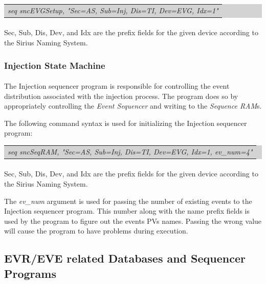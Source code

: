 \documentclass[openany]{article}
\begin{document}
			\bigskip
			\colorbox{lightgray}{
				\begin{tabularx}{0.9\textwidth}{X}
				\emph{seq sncEVGSetup, "Sec=AS, Sub=Inj, Dis=TI, Dev=EVG, Idx=1"}
				\end{tabularx}
			}

			\paragraph{} Sec, Sub, Dis, Dev, and Idx are the prefix fields for the given device according to the Sirius Naming System.
		\subsubsection{Injection State Machine}

			\paragraph{} The Injection sequencer program is responsible for controlling the event distribution associated with the injection process. The program does so by appropriately controlling the \emph{Event Sequencer} and writing to the \emph{Sequence RAM}s.
			\par The following command syntax is used for initializing the Injection sequencer program:

			\bigskip
			\colorbox{lightgray}{
				\begin{tabularx}{0.9\textwidth}{X}
				\emph{seq sncSeqRAM, "Sec=AS, Sub=Inj, Dis=TI, Dev=EVG, Idx=1, ev\_num=4"}
				\end{tabularx}
			}

			\paragraph{} Sec, Sub, Dis, Dev, and Idx are the prefix fields for the given device according to the Sirius Naming System.
			\par The \emph{ev\_num} argument is used for passing the number of existing events to the Injection sequencer program. This number along with the name prefix fields is used by the program to figure out the events PVs names. Passing the wrong value will cause the program to have problems during execution.

	\subsection{EVR/EVE related Databases and Sequencer Programs}
\end{document}
